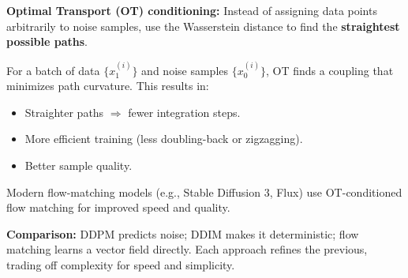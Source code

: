 \begin{paperbox}[title={Optimal Transport \& Flow Matching}]
\textbf{Optimal Transport (OT) conditioning:} Instead of assigning data points arbitrarily to noise samples, use the Wasserstein distance to find the \textbf{straightest possible paths}.

For a batch of data $\{x_1^{(i)}\}$ and noise samples $\{x_0^{(i)}\}$, OT finds a coupling that minimizes path curvature. This results in:
\begin{itemize}
  \item Straighter paths $\Rightarrow$ fewer integration steps.
  \item More efficient training (less doubling-back or zigzagging).
  \item Better sample quality.
\end{itemize}

Modern flow-matching models (e.g., Stable Diffusion 3, Flux) use OT-conditioned flow matching for improved speed and quality.

\begin{notebox}
\textbf{Comparison:} DDPM predicts noise; DDIM makes it deterministic; flow matching learns a vector field directly. Each approach refines the previous, trading off complexity for speed and simplicity.
\end{notebox}
\end{paperbox}

